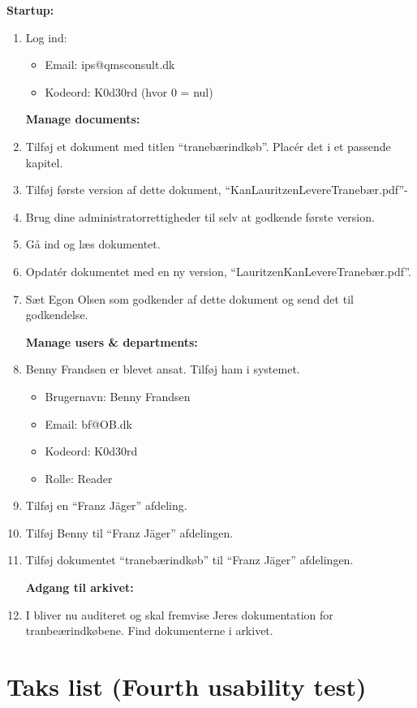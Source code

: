 \textbf{Startup:}
\begin{enumerate}
	\item Log ind:
		\begin{itemize}
			\item Email: ips@qmsconsult.dk
			\item Kodeord: K0d30rd   (hvor 0 = nul)
		\end{itemize}

\textbf{Manage documents:}
	\item Tilføj et dokument med titlen “tranebærindkøb”. Placér det i et passende kapitel.
	\item Tilføj første version af dette dokument, “KanLauritzenLevereTranebær.pdf”-
	\item Brug dine administratorrettigheder til selv at godkende første version.
	\item Gå ind og læs dokumentet.
	\item Opdatér dokumentet med en ny version, “LauritzenKanLevereTranebær.pdf”.
	\item Sæt Egon Olsen som godkender af dette dokument og send det til godkendelse.

\textbf{Manage users \& departments:}
	\item Benny Frandsen er blevet ansat. Tilføj ham i systemet.
		\begin{itemize}
			\item Brugernavn: Benny Frandsen
			\item Email: bf@OB.dk
			\item Kodeord: K0d30rd
			\item Rolle: Reader
		\end{itemize}
	\item Tilføj en “Franz Jäger” afdeling.
	\item Tilføj Benny til “Franz Jäger” afdelingen.
	\item Tilføj dokumentet “tranebærindkøb” til “Franz Jäger” afdelingen.

\textbf{Adgang til arkivet:}
	\item I bliver nu auditeret og skal fremvise Jeres dokumentation for tranbeærindkøbene. Find dokumenterne i arkivet.
\end{enumerate}


\section{Taks list (Fourth usability test)} \label{sec:utest4tasklist}

